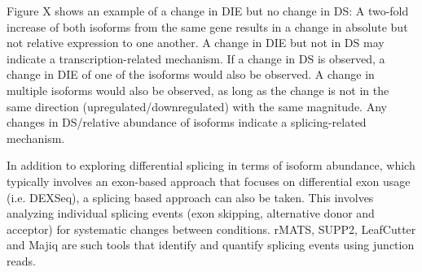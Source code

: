 Figure X shows an example of a change in DIE but no change in DS: A two-fold increase of both isoforms from the same gene results in a change in absolute but not relative expression to one another. A change in DIE but not in DS may indicate a transcription-related mechanism. If a change in DS is observed, a change in DIE of one of the isoforms would also be observed. A change in multiple isoforms would also be observed, as long as the change is not in the same direction (upregulated/downregulated) with the same magnitude. Any changes in DS/relative abundance of isoforms indicate a splicing-related mechanism. 

In addition to exploring differential splicing in terms of isoform abundance, which typically involves an exon-based approach that focuses on differential exon usage (i.e. DEXSeq), a splicing based approach can also be taken. This involves analyzing individual splicing events (exon skipping, alternative donor and acceptor) for systematic changes between conditions. rMATS, SUPP2, LeafCutter and Majiq are such tools that identify and quantify splicing events using junction reads. 

